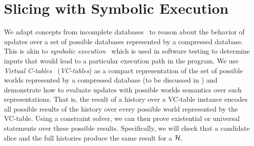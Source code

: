 \section{Slicing with Symbolic Execution}
\label{sec:sym-exe}
%
%
%
%
%

We adapt concepts from incomplete databases~\cite{IL84a} to reason about the behavior of updates over a set of possible databases represented by a compressed database. This is akin to \textit{symbolic execution}~\cite{cadar13,K76} which is used in software testing to determine inputs that would lead to a particular execution path in the program.
%
We use \textit{Virtual C-tables}~\cite{pip10,lenses15} (\textit{VC-tables}) as a compact representation of the set of possible worlds represented by a compressed database (to be discussed in ) and demonstrate how to evaluate updates with possible worlds semantics over such representations. That is, the result of a history over a VC-table instance encodes all possible results of the history over every possible world represented by the VC-table. Using a constraint solver, we can then prove existential or universal statements over these possible results. Specifically, we will check that a candidate slice and the full histories produce the same result for a \abbrHW $\mathcal{H}$.
%

%


%

%
%
%
%
%
%
